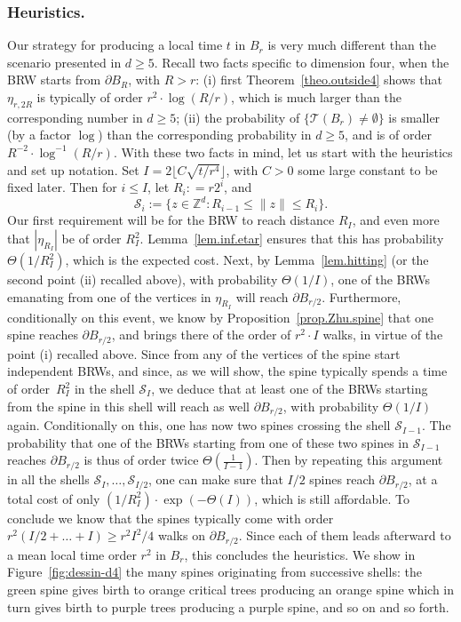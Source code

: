 \documentclass[JEP,XML,SOM,Unicode,NoFloatCountersInSection,published]{cedram}
\theoremstyle{plain}
\theoremstyle{definition}
\newcommand{\1}{{\text{\Large $\mathfrak 1$}}}
\begin{document}
\subsubsection*{Heuristics.}
Our strategy for producing a local time $t$ in $B_r$
is very much different than the scenario presented in $d\ge 5$.
Recall
two facts specific to dimension four, when the BRW starts from $\partial B_R$, with $R>r$: (i) first Theorem~\ref{theo.outside4} shows that $\eta_{r,2R}$
is typically of order
$r^2\cdot \log(R/r)$, which is much larger than the corresponding
number in $d\ge 5$; (ii) the probability of $\{\mathcal T(B_r) \neq
\emptyset\}$ is smaller (by a factor $\log$) than the corresponding
probability in $d\ge 5$, and is of order $R^{-2}\cdot\log^{-1}(R/r)$.
With these two facts in mind, let us start with the heuristics and
set up notation.
Set $I = 2\lfloor C\sqrt{t/r^4}\rfloor $, with $C>0$ some large constant to be fixed later.
Then for $i\le I$, let $R_i: = r 2^i$, and
\[
\mathcal S_i:= \{z\in \mathbb Z^d : R_{i-1} \le \|z\|\le R_i\}.
\]
Our first requirement will be for the BRW to reach distance $R_I$,
and even more that $|\eta_{R_I}|$ be of order $R_I^2$.
Lemma~\ref{lem.inf.etar} ensures that this has probability $\Theta(1/R_I^2)$, which is the expected cost.
Next, by Lemma~\ref{lem.hitting} (or the second point (ii) recalled above), with probability $\Theta(1/I)$, one of the BRWs emanating from one of the vertices in $\eta_{R_I}$ will reach $\partial B_{r/2}$.
Furthermore, conditionally on this event,
we know by Proposition~\ref{prop.Zhu.spine}
that one spine reaches $\partial B_{r/2}$, and brings there of the order
of $r^2\cdot I$ walks, in virtue of the point (i) recalled above.
Since from any of the vertices of the spine start independent BRWs,
and since, as we will show, the spine typically spends a time
of order~$R_I^2$ in the shell $\mathcal S_I$,
we deduce that at least one of the BRWs starting from the
spine in this shell will reach as well $\partial B_{r/2}$,
with probability $\Theta(1/I)$ again.
Conditionally on this, one has now two spines
crossing the shell $\mathcal S_{I-1}$.
The probability that one of the BRWs starting from one of these two spines in $\mathcal S_{I-1}$ reaches $\partial B_{r/2}$ is thus of
order twice $\Theta(\frac 1{I-1})$. Then by repeating this argument in all the shells $\mathcal S_I,\dots,\mathcal S_{I/2}$,
one can make sure that $I/2$ spines reach $\partial B_{r/2}$, at a total cost of only
$(1/R_I^2)\cdot \exp(-\Theta(I))$, which is still affordable.
To conclude we know that the spines typically come with
order $r^2(I/2+\dots+I)\ge r^2I^2/4$ walks on $\partial B_{r/2}$.
Since each of them leads afterward to a mean local time order
$r^2$ in $B_r$, this concludes the heuristics. We show in
Figure~\ref{fig:dessin-d4} the many spines originating from successive
shells: the green spine gives birth to orange critical trees producing
an orange spine which in turn gives birth to purple trees producing
a purple spine, and so on and so forth.
\end{document}
